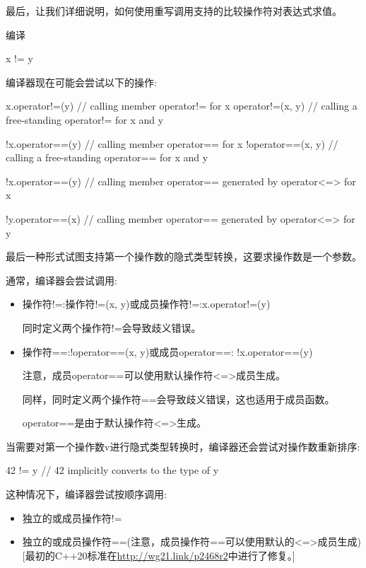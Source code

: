 最后，让我们详细说明，如何使用重写调用支持的比较操作符对表达式求值。



编译

\begin{cpp}
x != y
\end{cpp}

编译器现在可能会尝试以下的操作:

\begin{cpp}
x.operator!=(y) // calling member operator!= for x
operator!=(x, y) // calling a free-standing operator!= for x and y

!x.operator==(y) // calling member operator== for x
!operator==(x, y) // calling a free-standing operator== for x and y

!x.operator==(y) // calling member operator== generated by operator<=> for x

!y.operator==(x) // calling member operator== generated by operator<=> for y
\end{cpp}

最后一种形式试图支持第一个操作数的隐式类型转换，这要求操作数是一个参数。

通常，编译器会尝试调用:

\begin{itemize}
\item
操作符!=:操作符!=(x, y)或成员操作符!=:x.operator!=(y)

同时定义两个操作符!=会导致歧义错误。

\item
操作符==:!operator==(x, y)或成员operator==: !x.operator==(y)

注意，成员operator==可以使用默认操作符<=>成员生成。

同样，同时定义两个操作符==会导致歧义错误，这也适用于成员函数。

operator==是由于默认操作符<=>生成。
\end{itemize}

当需要对第一个操作数v进行隐式类型转换时，编译器还会尝试对操作数重新排序:

\begin{cpp}
42 != y // 42 implicitly converts to the type of y
\end{cpp}

这种情况下，编译器尝试按顺序调用:

\begin{itemize}
\item
独立的或成员操作符!=

\item
独立的或成员操作符==(注意，成员操作符==可以使用默认的<=>成员生成)[最初的C++20标准在\url{http://wg21.link/p2468r2}中进行了修复。]
\end{itemize}

